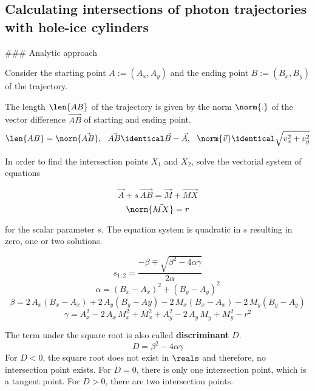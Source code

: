 
\subsection{Calculating intersections of photon trajectories with hole-ice cylinders}
\label{sec:intersections}

### Analytic approach


Consider the starting point $A := (A_x, A_y)$ and the ending point $B := (B_x, B_y)$ of the trajectory.

The length $\len{AB}$ of the trajectory is given by the norm $\norm{.}$ of the vector difference $\vec{AB}$ of starting and ending point.
\begin{equation} \notag
  \len{AB} = \norm{\vec{AB}}, \ \ \vec{AB} \identical \vec{B} - \vec{A}, \ \ \norm{\vec{v}} \identical \sqrt{v_x^2 + v_y^2}
\end{equation}

In order to find the intersection points $X_1$ and $X_2$, solve the vectorial system of equations

\begin{equation}
  \vec{A} + s \, \vec{AB} = \vec{M} + \vec{MX}
\end{equation}
\begin{equation}
  \norm{\vec{MX}} = r
\end{equation}

for the scalar parameter $s$. The equation system is quadratic in $s$ resulting in zero, one or two solutions.

\begin{equation}
  s_{1,2} = \frac{-\beta \mp \sqrt{\beta^2 - 4\alpha\gamma}}{2\alpha}
\end{equation}
\begin{equation}
  \alpha = (B_x - A_x)^2 + (B_y - A_y)^2
\end{equation}
\begin{equation}
  \beta = 2\,A_x(B_x-A_x) + 2\,A_y(B_y-Ay) - 2\,M_x(B_x-A_x) - 2\,M_y(B_y-A_y)
\end{equation}
\begin{equation}
  \gamma = A_x^2 - 2\,A_x\,M_x^2 + M_x^2 + A_y^2 - 2\,A_y\,M_y + M_y^2 - r^2
\end{equation}

The term under the square root is also called \textbf{discriminant} $D$.
\begin{equation}
  D = \beta^2 - 4\alpha\gamma
\end{equation}
For $D < 0$, the square root does not exist in $\reals$ and therefore, no intersection point exists. For $D = 0$, there is only one intersection point, which is a tangent point. For $D > 0$, there are two intersection points.

